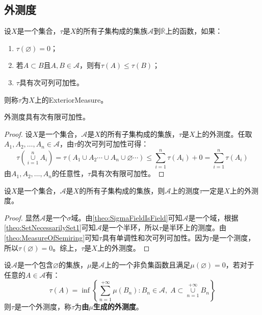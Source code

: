 \subsection{外测度}
\begin{definition}
	设$X$是一个集合，$\tau$是$X$的所有子集构成的集族$\mathscr{A}$到$\overline{\mathbb{R}}$上的函数，如果：
	\begin{enumerate}
		\item $\tau(\varnothing)=0$；
		\item 若$A\subset B$且$A,B\in\mathscr{A}$，则有$\tau(A)\leqslant\tau(B)$；
		\item $\tau$具有次可列可加性。
	\end{enumerate}
	则称$\tau$为$X$上的\gls{ExteriorMeasure}。
\end{definition}
\begin{theorem}\label{theo:SubadditivityExteriorMeasure}
	外测度具有次有限可加性。
\end{theorem}
\begin{proof}
	设$X$是一个集合，$\mathscr{A}$是$X$的所有子集构成的集族，$\tau$是$X$上的外测度。任取$A_1,A_2,\dots,A_n\in\mathscr{A}$，由$\tau$的次可列可加性可得：
	\begin{equation*}
		\tau\left(\underset{i=1}{\overset{n}{\cup}}A_i\right)=\tau(A_1\cup A_2\cdots\cup A_n\cup\varnothing\cdots)\leqslant\sum_{i=1}^{n}\tau(A_i)+0=\sum_{i=1}^{n}\tau(A_i)
	\end{equation*}
	由$A_1,A_2,\dots,A_n$的任意性，$\tau$具有次有限可加性。
\end{proof}
\begin{theorem}
	设$X$是一个集合，$\mathscr{A}$是$X$的所有子集构成的集族，则$\mathscr{A}$上的测度$\tau$一定是$X$上的外测度。
\end{theorem}
\begin{proof}
	显然$\mathscr{A}$是一个$\sigma$域。由\cref{theo:SigmaFieldIsField}可知$\mathscr{A}$是一个域，根据\cref{theo:SetNecessarilySet1}可知$\mathscr{A}$是一个半环，所以$\tau$是半环上的测度。由\cref{theo:MeasureOfSemiring}可知$\tau$具有单调性和次可列可加性。因为$\tau$是一个测度，所以$\tau(\varnothing)=0$。综上，$\tau$是$X$上的外测度。
\end{proof}
\begin{theorem}
	设$\mathscr{A}$是一个包含$\varnothing$的集族，$\mu$是$\mathscr{A}$上的一个非负集函数且满足$\mu(\varnothing)=0$，若对于任意的$A\in\mathscr{A}$有：
	\begin{equation*}
		\tau(A)=\inf\left\{\sum_{n=1}^{+\infty}\mu(B_n):B_n\in\mathscr{A},\;A\subset\underset{n=1}{\overset{+\infty}{\cup}}B_n\right\}
	\end{equation*}
	则$\tau$是一个外测度，称$\tau$为\textbf{由$\mu$生成的外测度}。
\end{theorem}
